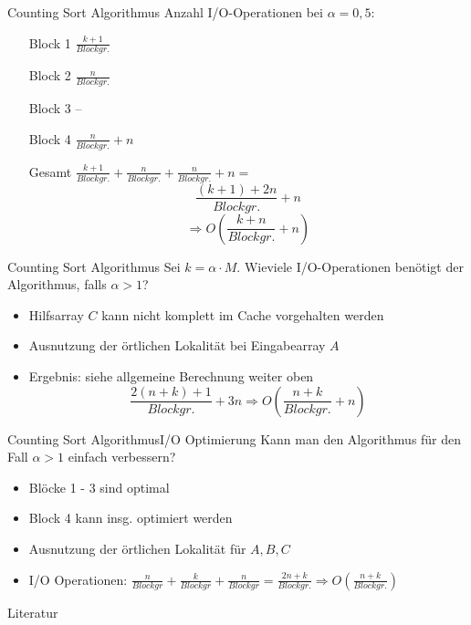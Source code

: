 \documentclass{beamer}
\begin{document}
\begin{frame}{Counting Sort Algorithmus}
  Anzahl I/O-Operationen bei $\alpha = 0,5$:
  \begin{itemize}
    \item[Block 1] $\frac{k+1}{Blockgr.}$
    \item[Block 2] $\frac{n}{Blockgr.}$
    \item[Block 3] --
    \item[Block 4] $\frac{n}{Blockgr.} + n$
    \item[Gesamt] $\frac{k+1}{Blockgr.} + \frac{n}{Blockgr.} + \frac{n}{Blockgr.} + n =$
    \begin{equation*}
    \frac{(k + 1) + 2n}{Blockgr.} + n
    \end{equation*}
    \begin{equation*}
    \Rightarrow O(\frac{k + n}{Blockgr.} + n)
    \end{equation*}
  \end{itemize}
\end{frame}


\begin{frame}{Counting Sort Algorithmus}
  Sei $k = \alpha \cdot M$. Wieviele I/O-Operationen benötigt der Algorithmus, falls $\alpha > 1$?
  \begin{itemize}
    \item Hilfsarray $C$ kann nicht komplett im Cache vorgehalten werden
    \item Ausnutzung der örtlichen Lokalität bei Eingabearray $A$
    \item Ergebnis: siehe allgemeine Berechnung weiter oben
    \begin{equation*}
    \frac{2(n+k)+1}{Blockgr.}+3n \Rightarrow O(\frac{n+k}{Blockgr.}+n)
    \end{equation*}
  \end{itemize}
\end{frame}

\begin{frame}[fragile]{Counting Sort Algorithmus}{I/O Optimierung}
  Kann man den Algorithmus für den Fall $\alpha > 1$ einfach verbessern?
  \begin{itemize}
    \item<1-> Blöcke 1 - 3 sind optimal
    \item<1-> Block 4 kann insg. optimiert werden
    \item<3> Ausnutzung der örtlichen Lokalität für $A, B, C$
    \item<3> I/O Operationen: $\frac{n}{Blockgr} + \frac{k}{Blockgr} + \frac{n}{Blockgr} = \frac{2n+k}{Blockgr.} \Rightarrow O(\frac{n+k}{Blockgr.})$
  \end{itemize}

  \begin{semiverbatim}
  \end{semiverbatim}
\end{frame}

\begin{frame}{Literatur}
  
  
\end{frame}
\end{document}
